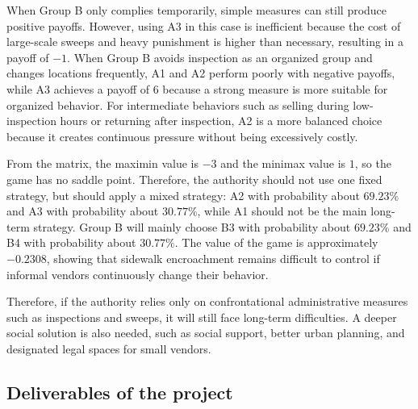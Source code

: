 \documentclass[12pt,a4paper]{article}
\begin{document}
When Group B only complies temporarily, simple measures can still produce positive payoffs. However, using A3 in this case is inefficient because the cost of large-scale sweeps and heavy punishment is higher than necessary, resulting in a payoff of $-1$. When Group B avoids inspection as an organized group and changes locations frequently, A1 and A2 perform poorly with negative payoffs, while A3 achieves a payoff of $6$ because a strong measure is more suitable for organized behavior. For intermediate behaviors such as selling during low-inspection hours or returning after inspection, A2 is a more balanced choice because it creates continuous pressure without being excessively costly.

From the matrix, the maximin value is $-3$ and the minimax value is $1$, so the game has no saddle point. Therefore, the authority should not use one fixed strategy, but should apply a mixed strategy: A2 with probability about $69.23\%$ and A3 with probability about $30.77\%$, while A1 should not be the main long-term strategy. Group B will mainly choose B3 with probability about $69.23\%$ and B4 with probability about $30.77\%$. The value of the game is approximately $-0.2308$, showing that sidewalk encroachment remains difficult to control if informal vendors continuously change their behavior.

Therefore, if the authority relies only on confrontational administrative measures such as inspections and sweeps, it will still face long-term difficulties. A deeper social solution is also needed, such as social support, better urban planning, and designated legal spaces for small vendors.

\subsection{Deliverables of the project}
\end{document}
